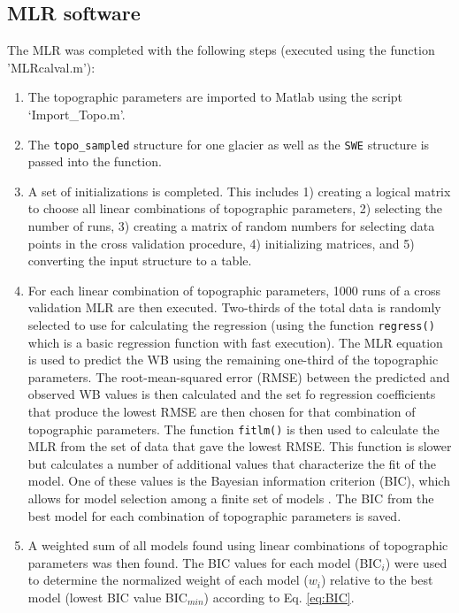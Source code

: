 \documentclass{sfuthesis}
\begin{document}
\begin{appendices}
	\chapter{MLR software}
\label{sec:MLRMethods}

The MLR was completed with the following steps (executed using the function 'MLRcalval.m'):
\begin{enumerate}
\item The topographic parameters are imported to Matlab using the script `Import\_Topo.m'.

\item The \texttt{topo\_sampled} structure for one glacier as well as the \texttt{SWE} structure is passed into the function.

\item A set of initializations is completed. This includes 1) creating a logical matrix to choose all linear combinations of topographic parameters, 2) selecting the number of runs, 3) creating a matrix of random numbers for selecting data points in the cross validation procedure, 4) initializing matrices, and 5) converting the input structure to a table.

\item For each linear combination of topographic parameters, 1000 runs of a cross validation MLR are then executed. Two-thirds of the total data is randomly selected \citep{Kohavi1995} to use for calculating the regression (using the function \texttt{regress()} which is a basic regression function with fast execution). The MLR equation is used to predict the WB using the remaining one-third of the topographic parameters. The root-mean-squared error (RMSE) between the predicted and observed WB values is then calculated and the set fo regression coefficients that produce the lowest RMSE are then chosen for that combination of topographic parameters. The function \texttt{fitlm()} is then used to calculate the MLR from the set of data that gave the lowest RMSE. This function is slower but calculates a number of additional values that characterize the fit of the model. One of these values is the Bayesian information criterion (BIC), which allows for model selection among a finite set of models \citep{Burnham2004}. The BIC from the best model for each combination of topographic parameters is saved.

\item A weighted sum of all models found using linear combinations of topographic parameters was then found. The BIC values for each model (BIC$_i$) were used to determine the normalized weight of each model ($w_i$) relative to the best model (lowest BIC value BIC$_{min}$) according to Eq. \ref{eq:BIC}.


\end{enumerate}
\end{appendices}
\end{document}
